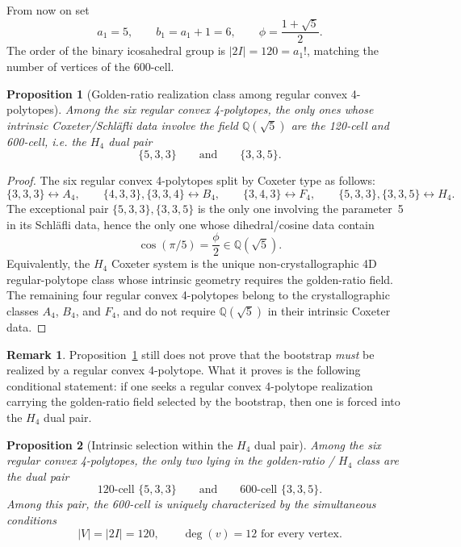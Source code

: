 \documentclass[12pt,a4paper]{article}
\newtheorem{proposition}{Proposition}
\theoremstyle{definition}
\newtheorem{remark}{Remark}
\begin{document}
From now on set
\[
a_1=5,\qquad b_1=a_1+1=6,\qquad \phi=\frac{1+\sqrt{5}}{2}.
\]
The order of the binary icosahedral group is $|2I|=120=a_1!$, matching the number of vertices of the 600-cell.

\begin{proposition}[Golden-ratio realization class among regular convex 4-polytopes]
\label{prop:golden_class}
Among the six regular convex 4-polytopes, the only ones whose intrinsic Coxeter/Schl\"afli data involve the field $\mathbb{Q}(\sqrt{5})$ are the 120-cell and 600-cell, i.e. the $H_4$ dual pair
\[
\{5,3,3\}
\qquad\text{and}\qquad
\{3,3,5\}.
\]
\end{proposition}

\begin{proof}
The six regular convex 4-polytopes split by Coxeter type as follows:
\[
\{3,3,3\}\leftrightarrow A_4,\qquad
\{4,3,3\},\{3,3,4\}\leftrightarrow B_4,\qquad
\{3,4,3\}\leftrightarrow F_4,\qquad
\{5,3,3\},\{3,3,5\}\leftrightarrow H_4.
\]
The exceptional pair $\{5,3,3\},\{3,3,5\}$ is the only one involving the parameter~5 in its Schl\"afli data, hence the only one whose dihedral/cosine data contain
\[
\cos(\pi/5)=\frac{\phi}{2}\in \mathbb{Q}(\sqrt{5}).
\]
Equivalently, the $H_4$ Coxeter system is the unique non-crystallographic 4D regular-polytope class whose intrinsic geometry requires the golden-ratio field.  The remaining four regular convex 4-polytopes belong to the crystallographic classes $A_4$, $B_4$, and $F_4$, and do not require $\mathbb{Q}(\sqrt{5})$ in their intrinsic Coxeter data.
\end{proof}

\begin{remark}
Proposition~\ref{prop:golden_class} still does not prove that the bootstrap \emph{must} be realized by a regular convex 4-polytope.  What it proves is the following conditional statement: if one seeks a regular convex 4-polytope realization carrying the golden-ratio field selected by the bootstrap, then one is forced into the $H_4$ dual pair.
\end{remark}

\begin{proposition}[Intrinsic selection within the \texorpdfstring{$H_4$}{H4} dual pair]
\label{prop:h4_selection}
Among the six regular convex 4-polytopes, the only two lying in the golden-ratio / $H_4$ class are the dual pair
\[
120\text{-cell } \{5,3,3\}
\qquad\text{and}\qquad
600\text{-cell } \{3,3,5\}.
\]
Among this pair, the 600-cell is uniquely characterized by the simultaneous conditions
\begin{equation}
|V|=|2I|=120,
\qquad
\deg(v)=12 \text{ for every vertex.}
\label{eq:h4_selector}
\end{equation}
\end{proposition}
\end{document}
